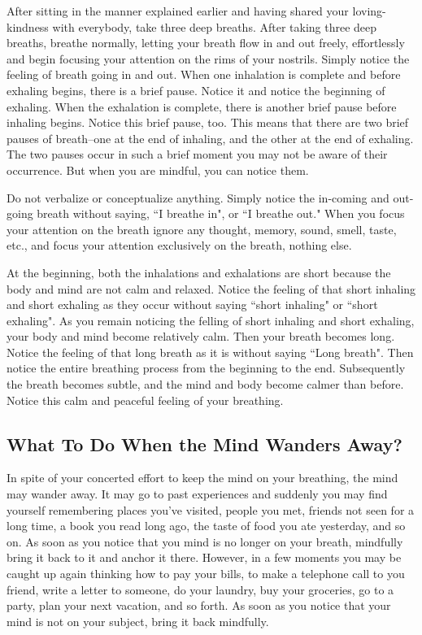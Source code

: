 After sitting in the manner explained earlier and having shared your
loving-kindness with everybody, take three deep breaths. After taking three deep
breaths, breathe normally, letting your breath flow in and out freely,
effortlessly and begin focusing your attention on the rims of your nostrils.
Simply notice the feeling of breath going in and out. When one inhalation is
complete and before exhaling begins, there is a brief pause. Notice it and
notice the beginning of exhaling. When the exhalation is complete, there is
another brief pause before inhaling begins. Notice this brief pause, too. This
means that there are two brief pauses of breath--one at the end of inhaling, and
the other at the end of exhaling. The two pauses occur in such a brief moment
you may not be aware of their occurrence. But when you are mindful, you can
notice them.

Do not verbalize or conceptualize anything. Simply notice the in-coming and
out-going breath without saying, ``I breathe in", or ``I breathe out." When you
focus your attention on the breath ignore any thought, memory, sound, smell,
taste, etc., and focus your attention exclusively on the breath, nothing else.

At the beginning, both the inhalations and exhalations are short because the
body and mind are not calm and relaxed. Notice the feeling of that short
inhaling and short exhaling as they occur without saying ``short inhaling" or
``short exhaling". As you remain noticing the felling of short inhaling and short
exhaling, your body and mind become relatively calm. Then your breath becomes
long. Notice the feeling of that long breath as it is without saying ``Long
breath". Then notice the entire breathing process from the beginning to the end.
Subsequently the breath becomes subtle, and the mind and body become calmer than
before. Notice this calm and peaceful feeling of your breathing.

\subsection*{What To Do When the Mind Wanders Away?}
In spite of your concerted effort to
keep the mind on your breathing, the mind may wander away. It may go to past
experiences and suddenly you may find yourself remembering places you've
visited, people you met, friends not seen for a long time, a book you read long
ago, the taste of food you ate yesterday, and so on. As soon as you notice that
you mind is no longer on your breath, mindfully bring it back to it and anchor
it there. However, in a few moments you may be caught up again thinking how to
pay your bills, to make a telephone call to you friend, write a letter to
someone, do your laundry, buy your groceries, go to a party, plan your next vacation, and so
forth. As soon as you notice that your mind is not on your subject, bring it
back mindfully.

